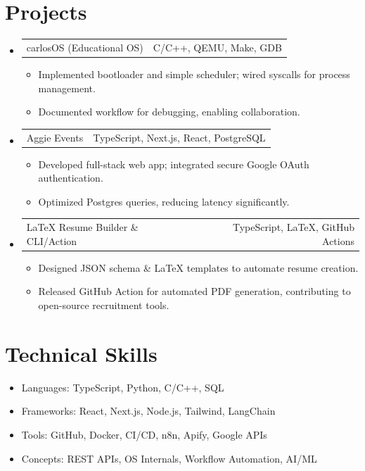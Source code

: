 \documentclass[letterpaper,11pt]{article}
\makeatletter
\newcommand{\resumeItem}[1]{
\item\small{{#1 \vspace{-2pt}}}
}
\newcommand{\resumeProjectHeading}[2]{
\item
\begin{tabular*}{0.97\textwidth}{l@{\extracolsep{\fill}}r}
\small#1 & #2 \\
\end{tabular*}\vspace{-7pt}
}
\newcommand{\resumeSubHeadingListStart}{\begin{itemize}[leftmargin=0.15in, label={}]}
\newcommand{\resumeSubHeadingListEnd}{\end{itemize}}
\newcommand{\resumeItemListStart}{\begin{itemize}}
\newcommand{\resumeItemListEnd}{\end{itemize}\vspace{-5pt}}
\makeatother
\begin{document}
\section{Projects}
\resumeSubHeadingListStart
\resumeProjectHeading
{carlosOS (Educational OS)}{C/C++, QEMU, Make, GDB}
\resumeItemListStart
\resumeItem{Implemented bootloader and simple scheduler; wired syscalls for process management.}
\resumeItem{Documented workflow for debugging, enabling collaboration.}
\resumeItemListEnd
\resumeProjectHeading
{Aggie Events}{TypeScript, Next.js, React, PostgreSQL}
\resumeItemListStart
\resumeItem{Developed full-stack web app; integrated secure Google OAuth authentication.}
\resumeItem{Optimized Postgres queries, reducing latency significantly.}
\resumeItemListEnd
\resumeProjectHeading
{LaTeX Resume Builder \& CLI/Action}{TypeScript, LaTeX, GitHub Actions}
\resumeItemListStart
\resumeItem{Designed JSON schema \& LaTeX templates to automate resume creation.}
\resumeItem{Released GitHub Action for automated PDF generation, contributing to open-source recruitment tools.}
\resumeItemListEnd
\resumeSubHeadingListEnd

\section{Technical Skills}
\resumeSubHeadingListStart
\resumeItem{Languages: TypeScript, Python, C/C++, SQL}
\resumeItem{Frameworks: React, Next.js, Node.js, Tailwind, LangChain}
\resumeItem{Tools: GitHub, Docker, CI/CD, n8n, Apify, Google APIs}
\resumeItem{Concepts: REST APIs, OS Internals, Workflow Automation, AI/ML}
\resumeSubHeadingListEnd
\end{document}
